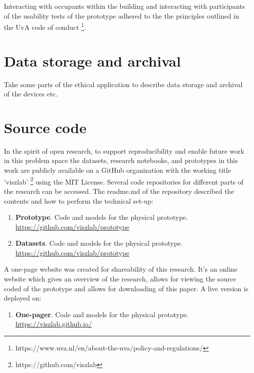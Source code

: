 \begin{appendices}
Interacting with occupants within the building and interacting with participants of the usability tests of the prototype adhered to the the principles outlined in the UvA code of conduct \footnote{https://www.uva.nl/en/about-the-uva/policy-and-regulations/}.

\section{Data storage and archival}
\label{sec:apx:first_appendix}

Take some parts of the ethical application to describe data storage and archival of the devices etc.

\section{Source code}

In the spirit of open research, to support reproducibility and enable future work in this problem space the datasets, research notebooks, and prototypes in this work are publicly available on a GitHub organization with the working title 'viszlab' \footnote{https://github.com/viszlab} using the MIT License. Several code repositories for different parts of the research can be accessed. The readme.md of the repository described the contents and how to perform the technical set-up:

\begin{enumerate}
  \item \textbf{Prototype}. Code and models for the physical prototype.\\
  \underline{https://github.com/viszlab/prototype}
  \item \textbf{Datasets}. Code and models for the physical prototype.\\
  \underline{https://github.com/viszlab/prototype}
\end{enumerate}

A one-page website was created for shareability of this research. It's an online website which gives an overview of the research, allows for viewing the source coded of the prototype and allows for downloading of this paper. A live version is deployed on:

\begin{enumerate}
  \item \textbf{One-pager}. Code and models for the physical prototype.\\
  \underline{https://viszlab.github.io/}
\end{enumerate}


\end{appendices}

